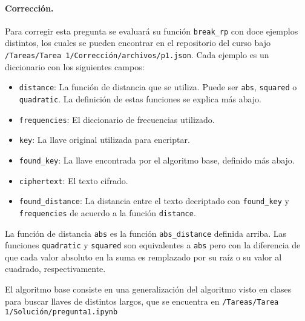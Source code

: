 \paragraph{Corrección.} Para corregir esta pregunta se evaluará su función \texttt{break\_rp} con doce ejemplos distintos, los cuales se pueden encontrar en el repositorio del curso bajo \texttt{/Tareas/Tarea 1/Corrección/archivos/p1.json}. Cada ejemplo es un diccionario con los siguientes campos:
\begin{itemize}
  \item \texttt{distance}: La función de distancia que se utiliza. Puede ser \texttt{abs}, \texttt{squared} o \texttt{quadratic}. La definición de estas funciones se explica más abajo.
  \item \texttt{frequencies}: El diccionario de frecuencias utilizado.
  \item \texttt{key}: La llave original utilizada para encriptar.
  \item \texttt{found\_key}: La llave encontrada por el algoritmo base, definido más abajo.
  \item \texttt{ciphertext}: El texto cifrado.
  \item \texttt{found\_distance}: La distancia entre el texto decriptado con \texttt{found\_key} y \texttt{frequencies} de acuerdo a la función \texttt{distance}.
\end{itemize}

La función de distancia \texttt{abs} es la función \texttt{abs\_distance} definida arriba. Las funciones \texttt{quadratic} y \texttt{squared} son equivalentes a \texttt{abs} pero con la diferencia de que cada valor absoluto en la suma es remplazado por su raíz o su valor al cuadrado, respectivamente. 

El algoritmo base consiste en una generalización del algoritmo visto en clases para buscar llaves de distintos largos, que se encuentra en \texttt{/Tareas/Tarea 1/Solución/pregunta1.ipynb}

